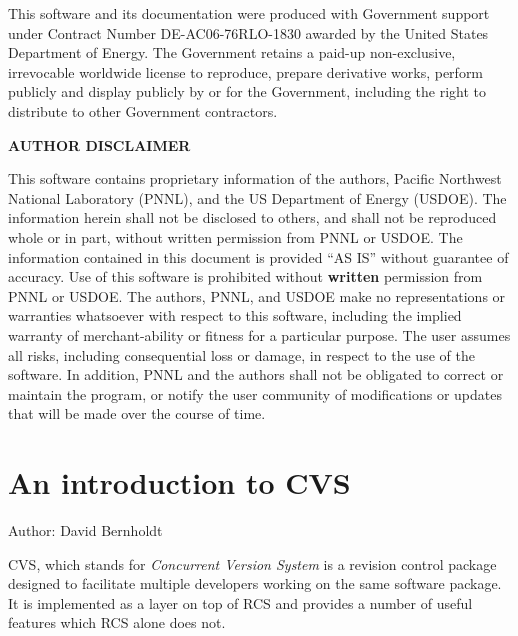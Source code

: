 This software and its documentation were produced with Government support under
Contract Number DE-AC06-76RLO-1830 awarded by the United States Department of
Energy.  The Government retains a paid-up non-exclusive, irrevocable worldwide
license to reproduce, prepare derivative works, perform publicly and display
publicly by or for the Government, including the right to distribute to other
Government contractors.


\clearpage

\begin{center}
{\bf AUTHOR DISCLAIMER}
\end{center}

This software contains proprietary information of the authors, Pacific
Northwest National Laboratory (PNNL), and the US Department of Energy (USDOE).
The information herein shall not be disclosed to others, and shall not
be reproduced whole or in part, without written permission from PNNL or
USDOE.  The information contained in this document is provided ``AS
IS'' without guarantee of accuracy.  Use of this software is
prohibited without {\bf written} permission from PNNL or USDOE.  The
authors, PNNL, and USDOE make no representations or warranties
whatsoever with respect to this software, including the implied
warranty of merchant-ability or fitness for a particular purpose.  The
user assumes all risks, including consequential loss or damage, in
respect to the use of the software.  In addition, PNNL and the authors
shall not be obligated to correct or maintain the program, or notify
the user community of modifications or updates that will be made over
the course of time.


\clearpage

\tableofcontents

\clearpage

\section{An introduction to CVS}

Author: David Bernholdt

CVS, which stands for {\it Concurrent Version System} is a revision
control package designed to facilitate multiple developers working on
the same software package.  It is implemented as a layer on top of RCS
and provides a number of useful features which RCS alone does not.

